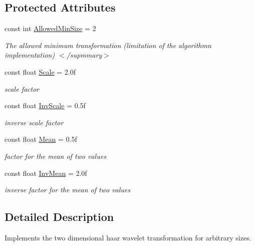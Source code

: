\subsection*{\-Protected \-Attributes}
\begin{DoxyCompactItemize}
\item 
\hypertarget{class_turbo_wavelets_1_1_haar_wavelet2_d_ae5d11cf5767f2bc0e7326922dc601a8e}{const int \hyperlink{class_turbo_wavelets_1_1_haar_wavelet2_d_ae5d11cf5767f2bc0e7326922dc601a8e}{\-Allowed\-Min\-Size} = 2}\label{class_turbo_wavelets_1_1_haar_wavelet2_d_ae5d11cf5767f2bc0e7326922dc601a8e}

\begin{DoxyCompactList}\small\item\em \-The allowed minimum transformation (limitation of the algorithmn implementation) $<$/supmmary$>$ \end{DoxyCompactList}\item 
const float \hyperlink{class_turbo_wavelets_1_1_haar_wavelet2_d_abb9a814259b4977ed274dde12f878f12}{\-Scale} = 2.\-0f
\begin{DoxyCompactList}\small\item\em scale factor \end{DoxyCompactList}\item 
const float \hyperlink{class_turbo_wavelets_1_1_haar_wavelet2_d_ab2fa94eb968bd48292856758c241b186}{\-Inv\-Scale} = 0.\-5f
\begin{DoxyCompactList}\small\item\em inverse scale factor \end{DoxyCompactList}\item 
const float \hyperlink{class_turbo_wavelets_1_1_haar_wavelet2_d_ae874d9a5f34ead2fbf4dc8efc4fc3e70}{\-Mean} = 0.\-5f
\begin{DoxyCompactList}\small\item\em factor for the mean of two values \end{DoxyCompactList}\item 
const float \hyperlink{class_turbo_wavelets_1_1_haar_wavelet2_d_aea88909dad98e2812d5b065da35ec361}{\-Inv\-Mean} = 2.\-0f
\begin{DoxyCompactList}\small\item\em inverse factor for the mean of two values \end{DoxyCompactList}\end{DoxyCompactItemize}


\subsection{\-Detailed \-Description}
\-Implements the two dimensional haar wavelet transformation for arbitrary sizes. 



